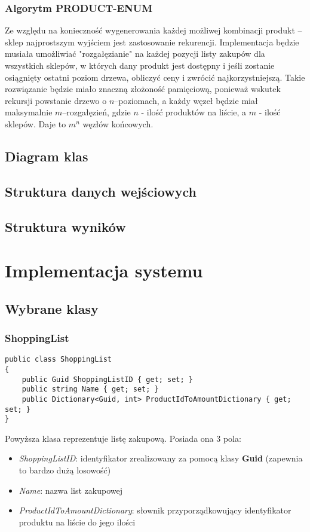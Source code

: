 \documentclass[a4paper]{article}
\let\oldsection\section
\renewcommand\section{\clearpage\oldsection}
\begin{document}
\subsubsection{Algorytm PRODUCT-ENUM}
Ze względu na konieczność wygenerowania każdej możliwej kombinacji produkt – sklep najprostszym wyjściem jest zastosowanie rekurencji. Implementacja będzie musiała umożliwiać "rozgałęzianie" na każdej pozycji listy zakupów dla wszystkich sklepów, w których dany produkt jest dostępny i jeśli zostanie osiągnięty ostatni poziom drzewa, obliczyć ceny i zwrócić najkorzystniejszą. Takie rozwiązanie będzie miało znaczną złożoność pamięciową, ponieważ wskutek rekursji powstanie drzewo o $n$–poziomach, a każdy węzeł będzie miał maksymalnie $m$–rozgałęzień, gdzie $n$ - ilość produktów na liście, a $m$ - ilość sklepów. Daje to $m^n$ węzłów końcowych.
\subsection{Diagram klas}
\subsection{Struktura danych wejściowych}
\subsection{Struktura wyników}

\section{Implementacja systemu}
\subsection{Wybrane klasy}
\subsubsection{ShoppingList}
\lstset{style=sharpc}
\begin{lstlisting}
public class ShoppingList
{
    public Guid ShoppingListID { get; set; }
    public string Name { get; set; }
	public Dictionary<Guid, int> ProductIdToAmountDictionary { get; set; }
}
\end{lstlisting}
\begin{flushleft}
Powyższa klasa reprezentuje listę zakupową. Posiada ona 3 pola: 
\begin{itemize}
\item \textit{ShoppingListID}: identyfikator zrealizowany za pomocą klasy \textbf{Guid} (zapewnia to bardzo dużą losowość)
\item \textit{Name}: nazwa list zakupowej
\item \textit{ProductIdToAmountDictionary}: słownik przyporządkowujący identyfikator produktu na liście do jego ilości
\end{itemize}
\end{flushleft}
\end{document}
